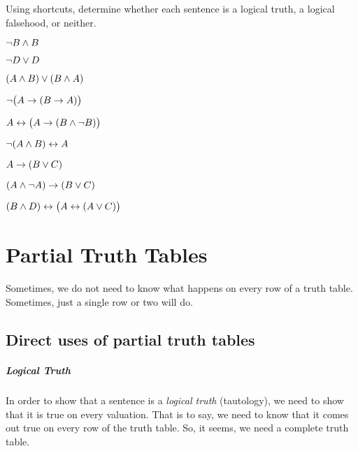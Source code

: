 

\practiceproblems
\problempart
\label{pr.TT.TTorCS}
Using shortcuts, determine whether each sentence is a logical truth, a logical falsehood, or neither. 
\begin{earg}
\item $\neg B \wedge B$ %
\item $\neg D \vee D$ %
\item $(A\wedge B) \vee (B\wedge A)$ %
\item $\neg\bigl(A \rightarrow (B \rightarrow A) \bigr)$ %
\item $A \leftrightarrow \bigl(A \rightarrow (B \wedge \neg B) \bigr)$ %
\item $\neg(A\wedge B) \leftrightarrow A$ %
\item $A\rightarrow(B\vee C)$ %
\item $(A \wedge\neg A) \rightarrow (B \vee C)$ %
\item $(B\wedge D) \leftrightarrow \bigl(A \leftrightarrow(A \vee C) \bigr)$%
\end{earg}


\chapter{Partial Truth Tables}\label{s:PartialTruthTable}

Sometimes, we do not need to know what happens on every row of a truth table. Sometimes, just a single row or two will do. 

\section{Direct uses of partial truth tables}\label{s:directPartialTruthTable}

\paragraph{Logical Truth} 
In order to show that a sentence is a \emph{logical truth} (tautology), we need to show that it is true on every valuation. That is to say, we need to know that it comes out true on every row of the truth table. So, it seems, we need a complete truth table. 

